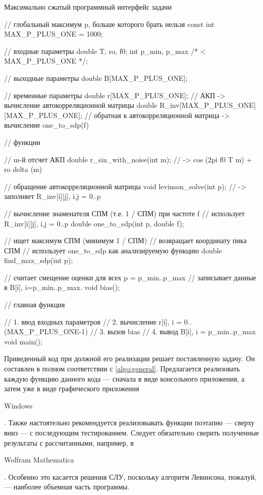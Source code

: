     \begin{listing}
        \caption{Максимально сжатый программный интерфейс задачи}
        \begin{cppcode}

            // глобальный максимум p, больше которого брать нельзя
            const int MAX_P_PLUS_ONE = 1000;

            // входные параметры
            double T, ro, f0;
            int    p_min, p_max /* < MAX_P_PLUS_ONE */;

            // выходные параметры
            double B[MAX_P_PLUS_ONE];

            // временные параметры
            double r[MAX_P_PLUS_ONE]; // АКП -> вычисление автокорреляционной матрицы
            double R_inv[MAX_P_PLUS_ONE][MAX_P_PLUS_ONE]; // обратная к автокорреляционной матрица -> вычисление one_to_sdp(f)

            // функции

            // m-й отсчет АКП
            double r_sin_with_noise(int m); // -> cos (2pi f0 T m) + ro delta (m)

            // обращение автокорреляционной матрицы
            void levinson_solve(int p); // -> заполняет R_inv[i][j], i,j = 0..p

            // вычисление знаменателя СПМ (т.е. 1 / СПМ) при частоте f
            // использует R_inv[i][j], i,j = 0..p
            double one_to_sdp(int p, double f);

            // ищет максимум СПМ (минимум 1 / СПМ)
            // возвращает координату пика СПМ
            // использует one_to_sdp как анализируемую функцию
            double find_max_sdp(int p);

            // считает смещение оценки для всех p = p_min..p_max
            // записывает данные в B[i], i=p_min..p_max.
            void bias();

            // главная функция

            // 1. ввод входных параметров
            // 2. вычисление r[i], i = 0..(MAX_P_PLUS_ONE-1)
            // 3. вызов bias
            // 4. вывод B[i], i = p_min..p_max
            void main();
        \end{cppcode}
    \end{listing}

    Приведенный код при должной его реализации решает поставленную задачу. Он составлен в полном соответствии с \autoref{algo:general}. Предлагается реализовать каждую функцию данного кода --- сначала в виде консольного приложения, а затем уже в виде графического приложения \begin{otherlanguage}{english}Windows\end{otherlanguage}. Также настоятельно рекомендуется реализовывать функции поэтапно --- сверху вниз --- с последующим тестированием. Следует обязательно сверить полученные результаты с рассчитанными, например, в \begin{otherlanguage}{english}Wolfram Mathematica\end{otherlanguage}. Особенно это касается решения СЛУ, поскольку алгоритм Левинсона, пожалуй, --- наиболее объемная часть программы.

